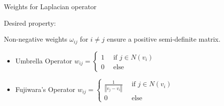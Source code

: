 \documentclass[10pt, compress, english]{beamer}
\begin{document}
%
%
%
%
%
%
%
%
%
%
%
%
%

\begin{frame}{Weights for Laplacian operator}


Desired property:

Non-negative weights $\omega_{ij}$ for $i\neq j$ ensure a positive
semi-definite matrix.
\begin{itemize}
\item Umbrella Operator $w_{ij}=\begin{cases}
1 & \,\,\,\mbox{if }j\in N\left(v_{i}\right)\\
0 & \,\,\,\mbox{else}
\end{cases}$
\item Fujiwara's Operator $w_{ij}=\begin{cases}
\frac{1}{\left\Vert v_{j}-v_{i}\right\Vert } & \,\,\,\mbox{if }j\in N\left(v_{i}\right)\\
0 & \,\,\,\mbox{else}
\end{cases}$
\end{itemize}






\end{frame}
\end{document}
